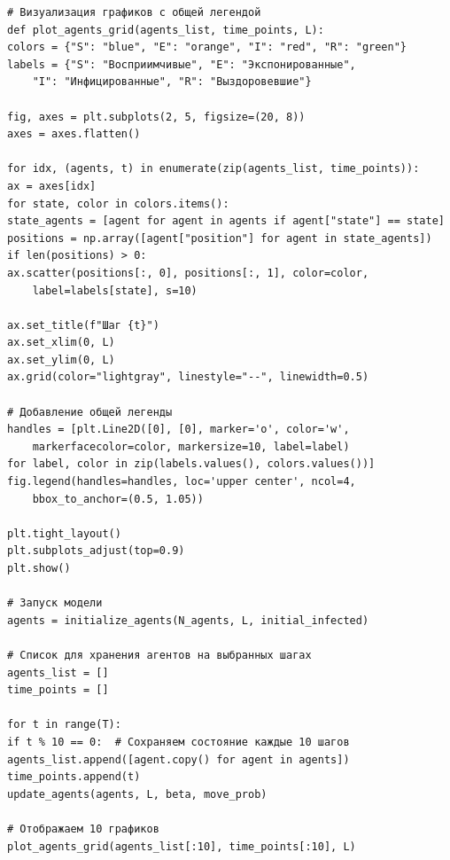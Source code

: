 \documentclass[a4paper, 14pt]{extreport}
\begin{document}
\begin{verbatim}
# Визуализация графиков с общей легендой
def plot_agents_grid(agents_list, time_points, L):
colors = {"S": "blue", "E": "orange", "I": "red", "R": "green"}
labels = {"S": "Восприимчивые", "E": "Экспонированные", 
	"I": "Инфицированные", "R": "Выздоровевшие"}

fig, axes = plt.subplots(2, 5, figsize=(20, 8))
axes = axes.flatten()

for idx, (agents, t) in enumerate(zip(agents_list, time_points)):
ax = axes[idx]
for state, color in colors.items():
state_agents = [agent for agent in agents if agent["state"] == state]
positions = np.array([agent["position"] for agent in state_agents])
if len(positions) > 0:
ax.scatter(positions[:, 0], positions[:, 1], color=color, 
	label=labels[state], s=10)

ax.set_title(f"Шаг {t}")
ax.set_xlim(0, L)
ax.set_ylim(0, L)
ax.grid(color="lightgray", linestyle="--", linewidth=0.5)

# Добавление общей легенды
handles = [plt.Line2D([0], [0], marker='o', color='w', 
	markerfacecolor=color, markersize=10, label=label) 
for label, color in zip(labels.values(), colors.values())]
fig.legend(handles=handles, loc='upper center', ncol=4, 
	bbox_to_anchor=(0.5, 1.05))

plt.tight_layout()
plt.subplots_adjust(top=0.9) 
plt.show()

# Запуск модели
agents = initialize_agents(N_agents, L, initial_infected)

# Список для хранения агентов на выбранных шагах
agents_list = []
time_points = []

for t in range(T):
if t % 10 == 0:  # Сохраняем состояние каждые 10 шагов
agents_list.append([agent.copy() for agent in agents])  
time_points.append(t)
update_agents(agents, L, beta, move_prob)

# Отображаем 10 графиков
plot_agents_grid(agents_list[:10], time_points[:10], L)
\end{verbatim}
\end{document}
